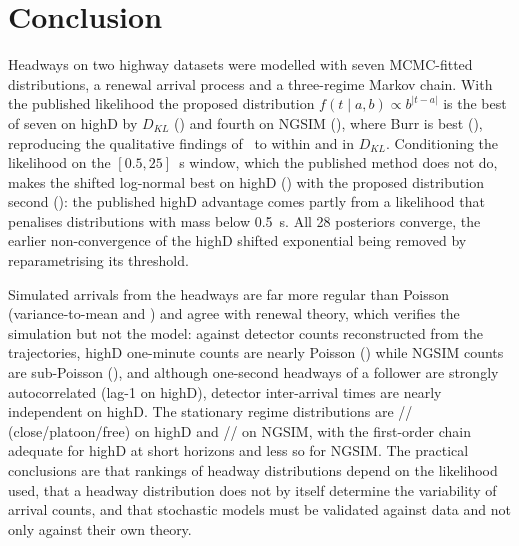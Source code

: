 \documentclass[10pt,a4paper]{article}
\numberwithin{equation}{section}
\begin{document}
\section{Conclusion}\label{sec:conclusion}
Headways on two highway datasets were modelled with seven MCMC-fitted distributions, a renewal arrival process and a three-regime Markov chain. With the published likelihood the proposed distribution $f(t\mid a,b)\propto b^{|t-a|}$ is the best of seven on highD by $D_{KL}$ (\hdKLPropPaper) and fourth on NGSIM (\ngKLProp), where Burr is best (\ngKLBurr), reproducing the qualitative findings of~\cite{leungbootnak} to within \hdKLMaxDiffPaper{} and \ngKLMaxDiffPaper{} in $D_{KL}$.
Conditioning the likelihood on the $[0.5,25]$~s window, which the published method does not do, makes the shifted log-normal best on highD (\hdKLSLN) with the proposed distribution second (\hdKLProp): the published highD advantage comes partly from a likelihood that penalises distributions with mass below 0.5~s. All 28 posteriors converge, the earlier non-convergence of the highD shifted exponential being removed by reparametrising its threshold.

Simulated arrivals from the headways are far more regular than Poisson (variance-to-mean \hdCV{} and \ngCV) and agree with renewal theory, which verifies the simulation but not the model: against detector counts reconstructed from the trajectories, highD one-minute counts are nearly Poisson (\hdDetFanoObs) while NGSIM counts are sub-Poisson (\ngDetFanoObs), and although one-second headways of a follower are strongly autocorrelated (lag-1 \hdLagOne{} on highD), detector inter-arrival times are nearly independent on highD.
The stationary regime distributions are \hdPiC/\hdPiP/\hdPiF{} (close/platoon/free) on highD and \ngPiC/\ngPiP/\ngPiF{} on NGSIM, with the first-order chain adequate for highD at short horizons and less so for NGSIM.
The practical conclusions are that rankings of headway distributions depend on the likelihood used, that a headway distribution does not by itself determine the variability of arrival counts, and that stochastic models must be validated against data and not only against their own theory.




\appendix
{}

\end{document}
